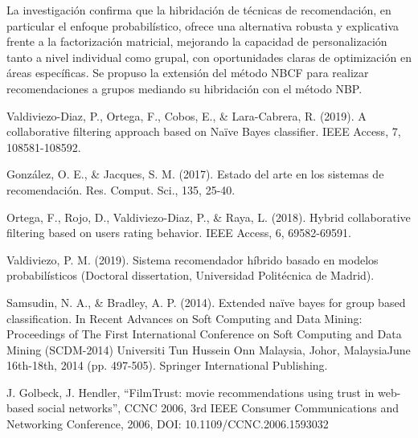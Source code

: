 \documentclass[twocolumn, fontsize=10pt]{article}
\begin{document}
La investigación confirma que la hibridación de técnicas de recomendación, en particular el enfoque probabilístico, ofrece una alternativa robusta y explicativa frente a la factorización matricial, mejorando la capacidad de personalización tanto a nivel individual como grupal, con oportunidades claras de optimización en áreas específicas. Se propuso la extensión del método NBCF para realizar recomendaciones a grupos mediando su hibridación con el método NBP.

\renewcommand\refname{Referencias}

\begin{thebibliography}{}

    Valdiviezo-Diaz, P., Ortega, F., Cobos, E., \& Lara-Cabrera, R. (2019). A collaborative filtering approach based on Naïve Bayes classifier. IEEE Access, 7, 108581-108592.
    
    González, O. E., \& Jacques, S. M. (2017). Estado del arte en los sistemas de recomendación. Res. Comput. Sci., 135, 25-40.
    
    Ortega, F., Rojo, D., Valdiviezo-Diaz, P., \& Raya, L. (2018). Hybrid collaborative filtering based on users rating behavior. IEEE Access, 6, 69582-69591.
    
    Valdiviezo, P. M. (2019). Sistema recomendador híbrido basado en modelos probabilísticos (Doctoral dissertation, Universidad Politécnica de Madrid).

    Samsudin, N. A., \& Bradley, A. P. (2014). Extended naïve bayes for group based classification. In Recent Advances on Soft Computing and Data Mining: Proceedings of The First International Conference on Soft Computing and Data Mining (SCDM-2014) Universiti Tun Hussein Onn Malaysia, Johor, MalaysiaJune 16th-18th, 2014 (pp. 497-505). Springer International Publishing.

    J. Golbeck, J. Hendler, “FilmTrust: movie recommendations using trust in web-based social networks”, CCNC 2006, 3rd IEEE Consumer Communications and Networking Conference, 2006, DOI: 10.1109/CCNC.2006.1593032 
    
\end{thebibliography}
    
    
\end{document}

